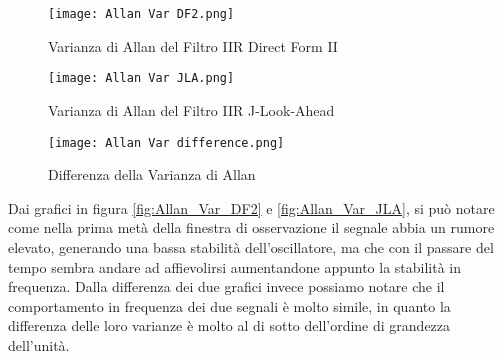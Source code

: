 \begin{figure}[H]
\centering
\texttt{[image: Allan Var DF2.png]}
\caption{Varianza di Allan del Filtro IIR Direct Form II}
\label{fig:Allan_Var_DF2}
\end{figure}

\begin{figure}[H]
\centering
\texttt{[image: Allan Var JLA.png]}
\caption{Varianza di Allan del Filtro IIR J-Look-Ahead}
\label{fig:Allan_Var_JLA}
\end{figure}

\begin{figure}[H]
\centering
\texttt{[image: Allan Var difference.png]}
\caption{Differenza della Varianza di Allan}
\label{fig:Allan_Var_difference}
\end{figure}

Dai grafici in figura \autoref{fig:Allan_Var_DF2} e \autoref{fig:Allan_Var_JLA}, si può notare come nella prima metà della finestra di osservazione il segnale abbia un rumore elevato, generando una bassa stabilità dell'oscillatore, ma che con il passare del tempo sembra andare ad affievolirsi aumentandone appunto la stabilità in frequenza. Dalla differenza dei due grafici invece possiamo notare che il comportamento in frequenza dei due segnali è molto simile, in quanto la differenza delle loro varianze è molto al di sotto dell'ordine di grandezza dell'unità.
